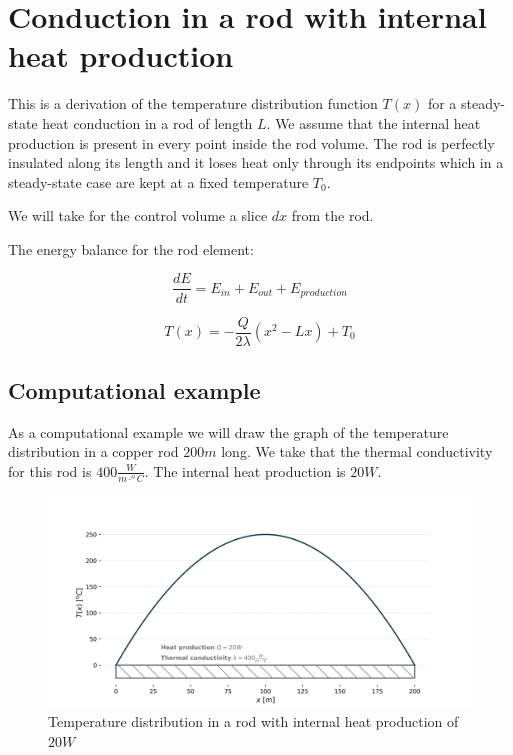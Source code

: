 \documentclass[10pt]{article}
\begin{document}
\setlength{\parskip}{0.6em}
\setlength{\parindent}{0cm}

\section*{Conduction in a rod with internal heat production}

This is a derivation of the temperature distribution function $T(x)$ for a steady-state heat conduction in a rod of length $L$. We assume that the internal heat production is present in every point inside the rod volume. The rod is perfectly insulated along its length and it loses heat only through its endpoints which in a steady-state case are kept at a fixed temperature $T_0$.

We will take for the control volume a slice $dx$ from the rod.

The energy balance for the rod element:

\begin{equation}
\frac{dE}{dt} = E_{in} + E_{out} + E_{production}
\end{equation}

\begin{equation}
T(x) = - \frac{Q}{2 \lambda} (x^2 - Lx) + T_0
\label{eq:solution}
\end{equation}




\subsection*{Computational example}

As a computational example we will draw the graph of the temperature distribution in a copper rod $200 m$ long. We take that the thermal conductivity for this rod is $400 \frac{W}{m \cdot ^o C}$. The internal heat production is $20 W$.

\begin{figure}[H]
\centering\includegraphics[width=18cm]{temperature_distribution.png}
\caption{Temperature distribution in a rod with internal heat production of $20 W$}
\label{fig:learning_curve}
\end{figure}
\end{document}
